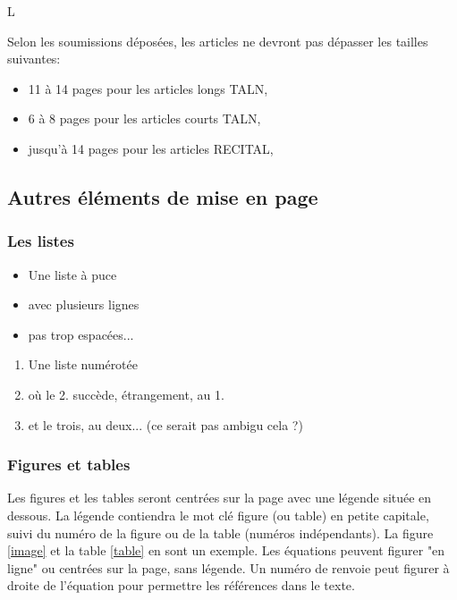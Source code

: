 \documentclass[10pt,a4paper,twoside]{article}
\begin{document}
L


Selon les soumissions déposées, les articles ne devront pas dépasser les tailles suivantes:

\begin{itemize}
\item 11 à 14 pages pour les articles longs TALN,
\item 6 à 8 pages pour les articles courts TALN,
\item jusqu'à 14 pages pour les articles RECITAL,

\end{itemize}

\subsection{Autres éléments de mise en page}

\subsubsection{Les listes}

\begin{itemize}
\item Une liste à puce
\item avec plusieurs lignes
\item pas trop espacées... 
\end{itemize}


\begin{enumerate}
\item Une liste numérotée
\item où le 2. succède, étrangement, au 1.
\item et le trois, au deux... (ce serait pas ambigu cela ?)
\end{enumerate}

\subsubsection{Figures et tables}

Les figures et les tables seront centrées sur la page avec une légende située en dessous. La légende contiendra le mot clé figure (ou table) en petite capitale, suivi du numéro de la figure ou de la table (numéros indépendants). La figure \ref{image} et la table \ref{table} en sont un exemple. Les équations peuvent figurer "en ligne" ou centrées sur la page, sans légende. Un numéro de renvoie peut figurer à droite de l'équation pour permettre les références dans le texte.
\end{document}
